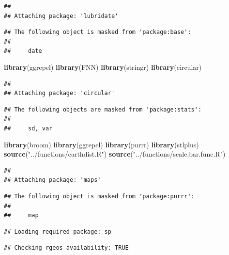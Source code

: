 \documentclass[10pt,A4,]{article}
\newenvironment{Shaded}{\begin{snugshade}}{\end{snugshade}}
\newcommand{\KeywordTok}[1]{\textcolor[rgb]{0.13,0.29,0.53}{\textbf{#1}}}
\newcommand{\StringTok}[1]{\textcolor[rgb]{0.31,0.60,0.02}{#1}}
\newcommand{\NormalTok}[1]{#1}
\begin{document}
\begin{verbatim}
## 
## Attaching package: 'lubridate'
\end{verbatim}

\begin{verbatim}
## The following object is masked from 'package:base':
## 
##     date
\end{verbatim}

\begin{Shaded}
\begin{Highlighting}[]
\KeywordTok{library}\NormalTok{(ggrepel)}
\KeywordTok{library}\NormalTok{(FNN)}
\KeywordTok{library}\NormalTok{(stringr)}
\KeywordTok{library}\NormalTok{(circular)}
\end{Highlighting}
\end{Shaded}

\begin{verbatim}
## 
## Attaching package: 'circular'
\end{verbatim}

\begin{verbatim}
## The following objects are masked from 'package:stats':
## 
##     sd, var
\end{verbatim}

\begin{Shaded}
\begin{Highlighting}[]
\KeywordTok{library}\NormalTok{(broom)}
\KeywordTok{library}\NormalTok{(ggrepel)}
\KeywordTok{library}\NormalTok{(purrr)}
\KeywordTok{library}\NormalTok{(stlplus)}
\KeywordTok{source}\NormalTok{(}\StringTok{"../functions/earthdist.R"}\NormalTok{)}
\KeywordTok{source}\NormalTok{(}\StringTok{"../functions/scale.bar.func.R"}\NormalTok{)}
\end{Highlighting}
\end{Shaded}

\begin{verbatim}
## 
## Attaching package: 'maps'
\end{verbatim}

\begin{verbatim}
## The following object is masked from 'package:purrr':
## 
##     map
\end{verbatim}

\begin{verbatim}
## Loading required package: sp
\end{verbatim}

\begin{verbatim}
## Checking rgeos availability: TRUE
\end{verbatim}
\end{document}
